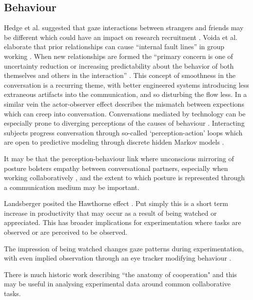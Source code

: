 \subsection{Behaviour}
Hedge et al. suggested that gaze interactions between strangers and friends may be different which could have an impact on research recruitment \cite{Hedge1978}. Voida et al. elaborate that prior relationships can cause ``internal fault lines'' in group working \cite{Voida2012}. %
When new relationships are formed the “primary concern is one of uncertainty reduction or increasing predictability about the behavior of both themselves and others in the interaction” \cite{berger1975some}. This concept of smoothness in the conversation is a recurring theme, with better engineered systems introducing less extraneous artifacts into the communication, and so disturbing the flow less. In a similar vein the actor-observer effect describes the mismatch between expections which can creep into conversation. Conversations mediated by technology can be especially prone to diverging perceptions of the causes of behaviour \cite{Jones1971}.%
Interacting subjects progress conversation through so-called `perception-action' loops which are open to predictive modeling through discrete hidden Markov models \cite{Mihoub2015}.\par
It may be that the perception-behaviour link where unconscious mirroring of posture bolsters empathy between conversational partners, especially when working collaboratively \cite{Chartrand1999}, and the extent to which posture is represented through a communication medium may be important.\par
Landsberger posited the Hawthorne effect \cite{Parsons922}. Put simply this is a short term increase in productivity that may occur as a result of being watched or appreciated. This has broader implications for experimentation where tasks are observed or are perceived to be observed.\par
The impression of being watched changes gaze patterns during experimentation, with even implied observation through an eye tracker modifying behaviour \cite{risko2011eyes}.\par
There is much historic work describing ``the anatomy of cooperation" \cite{Kollock1998} and this may be useful in analysing experimental data around common collaborative tasks.\par
